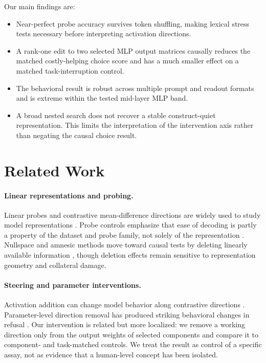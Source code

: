 \documentclass[10pt,twocolumn]{article}
\begin{document}
Our main findings are:
\begin{itemize}
    \item Near-perfect probe accuracy survives token shuffling, making lexical
    stress tests necessary before interpreting activation directions.
    \item A rank-one edit to two selected MLP output matrices causally reduces
    the matched costly-helping choice score and has a much smaller effect on a
    matched task-interruption control.
    \item The behavioral result is robust across multiple prompt and readout
    formats and is extreme within the tested mid-layer MLP band.
    \item A broad nested search does not recover a stable construct-quiet
    representation. This limits the interpretation of the intervention axis
    rather than negating the causal choice result.
\end{itemize}

\section{Related Work}

\paragraph{Linear representations and probing.}
Linear probes and contrastive mean-difference directions are widely used to
study model representations \cite{zou2023representation,marks2023geometry}.
Probe controls emphasize that ease of decoding is partly a property of the
dataset and probe family, not solely of the representation
\cite{hewitt2019control,belinkov2022probing}. Nullspace and amnesic methods move
toward causal tests by deleting linearly available information
\cite{ravfogel2020null,elazar2021amnesic}, though deletion effects remain
sensitive to representation geometry and collateral damage.

\paragraph{Steering and parameter interventions.}
Activation addition can change model behavior along contrastive directions
\cite{turner2023activation}. Parameter-level direction removal has produced
striking behavioral changes in refusal \cite{arditi2024refusal}. Our
intervention is related but more localized: we remove a working direction only
from the output weights of selected components and compare it to component- and
task-matched controls. We treat the result as control of a specific assay, not
as evidence that a human-level concept has been isolated.
\end{document}
